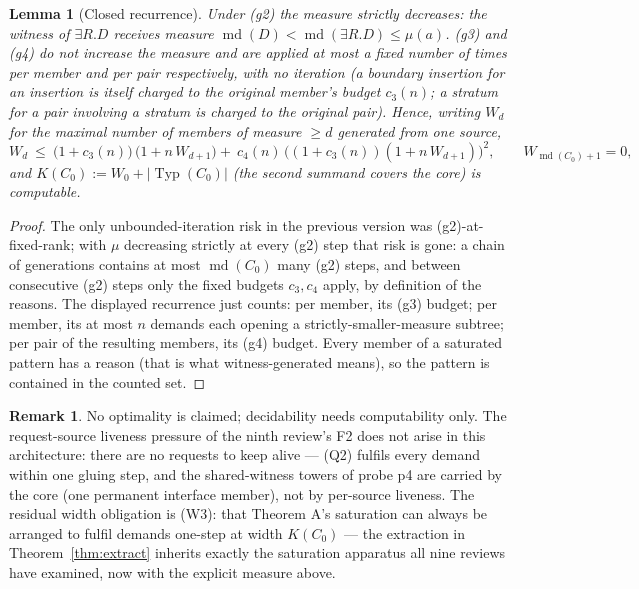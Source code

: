 \documentclass[11pt]{article}
\newtheorem{lemma}[theorem]{Lemma}
\theoremstyle{definition}
\newtheorem{remark}[theorem]{Remark}
\newcommand{\Typ}{\operatorname{Typ}}
\begin{document}
\begin{lemma}[Closed recurrence]\label{lem:rec}
Under (g2) the measure strictly decreases: the witness of
$\exists R.D$ receives measure $\operatorname{md}(D)<
\operatorname{md}(\exists R.D)\le\mu(a)$.  (g3) and (g4) do not
increase the measure and are applied at most a fixed number of times
per member and per pair respectively, with no iteration (a boundary
insertion for an insertion is itself charged to the original member's
budget $c_3(n)$; a stratum for a pair involving a stratum is charged to
the original pair).  Hence, writing $W_d$ for the maximal number of
members of measure $\ge d$ generated from one source,
\[
W_d\ \le\ \bigl(1+c_3(n)\bigr)\,\bigl(1+n\,W_{d+1}\bigr)
      +\ c_4(n)\,\bigl((1+c_3(n))(1+n\,W_{d+1})\bigr)^2 ,
\qquad W_{\operatorname{md}(C_0)+1}=0,
\]
and $K(C_0):=W_0+|\Typ(C_0)|$ (the second summand covers the core) is
computable.
\end{lemma}

\begin{proof}
The only unbounded-iteration risk in the previous version was
(g2)-at-fixed-rank; with $\mu$ decreasing strictly at every (g2) step
that risk is gone: a chain of generations contains at most
$\operatorname{md}(C_0)$ many (g2) steps, and between consecutive (g2)
steps only the fixed budgets $c_3,c_4$ apply, by definition of the
reasons.  The displayed recurrence just counts: per member, its (g3)
budget; per member, its at most $n$ demands each opening a
strictly-smaller-measure subtree; per pair of the resulting members,
its (g4) budget.  Every member of a saturated pattern has a reason
(that is what witness-generated means), so the pattern is contained in
the counted set.
\end{proof}

\begin{remark}
No optimality is claimed; decidability needs computability only.  The
request-source liveness pressure of the ninth review's F2 does not
arise in this architecture: there are no requests to keep alive ---
(Q2) fulfils every demand within one gluing step, and the shared-witness
towers of probe p4 are carried by the core (one permanent interface
member), not by per-source liveness.  The residual width obligation is
(W3): that Theorem A's saturation can always be arranged to fulfil
demands one-step at width $K(C_0)$ --- the extraction in
Theorem~\ref{thm:extract} inherits exactly the saturation apparatus all
nine reviews have examined, now with the explicit measure above.
\end{remark}
\end{document}
